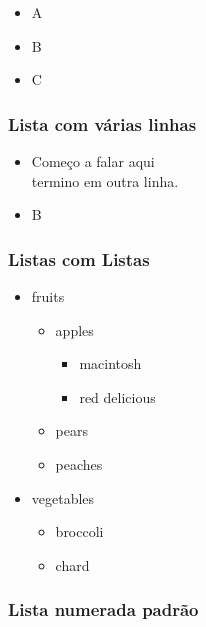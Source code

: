 \begin{itemize}
\tightlist
\item
  A
\item
  B
\item
  C
\end{itemize}

\hypertarget{lista-com-vuxe1rias-linhas}{%
\subsubsection{Lista com várias
linhas}\label{lista-com-vuxe1rias-linhas}}

\begin{itemize}
\tightlist
\item
  Começo a falar aqui\\
  termino em outra linha.
\item
  B
\end{itemize}

\hypertarget{listas-com-listas}{%
\subsubsection{Listas com Listas}\label{listas-com-listas}}

\begin{itemize}
\tightlist
\item
  fruits

  \begin{itemize}
  \tightlist
  \item
    apples

    \begin{itemize}
    \tightlist
    \item
      macintosh
    \item
      red delicious
    \end{itemize}
  \item
    pears
  \item
    peaches
  \end{itemize}
\item
  vegetables

  \begin{itemize}
  \tightlist
  \item
    broccoli
  \item
    chard
  \end{itemize}
\end{itemize}

\hypertarget{lista-numerada-padruxe3o}{%
\subsubsection{Lista numerada padrão}\label{lista-numerada-padruxe3o}}

